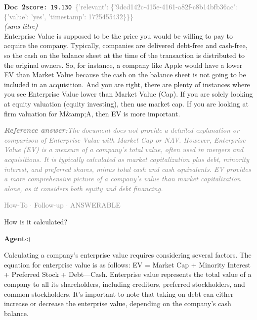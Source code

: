 \documentclass[a4paper,11pt]{article}
\begin{document}
\begin{docenv}
{\footnotesize\textcolor{doccolor}{\textbf{Doc~2}}}\hfill{\tiny\texttt{score:~19.130}}\ {\tiny\textcolor{gray}{\{'relevant': \{'9dcd142c-415e-4161-a82f-c8b14bfb36ac': \{'value': 'yes', 'timestamp': 1725455432\}\}\}}}\\[3pt]
{\small\textit{(sans titre)}}\\[2pt]
\vspace{2pt}
{\footnotesize 
Enterprise Value is supposed to be the price you would be willing to pay to acquire the company. Typically, companies are delivered debt-free and cash-free, so the cash on the balance sheet at the time of the transaction is distributed to the original owners. So, for instance, a company like Apple would have a lower EV than Market Value because the cash on the balance sheet is not going to be included in an acquisition.  And you are right, there are plenty of instances where you see Enterprise Value lower than Market Value (Cap).   If you are solely looking at equity valuation (equity investing), then use market cap. If you are looking at firm valuation for M\&amp;A, then EV is more important.}
\end{docenv}
\begin{refanswerenv}
{\footnotesize\textit{\textcolor{gray}{\textbf{Reference answer:}\enspace The document does not provide a detailed explanation or comparison of Enterprise Value with Market Cap or NAV. However, Enterprise Value (EV) is a measure of a company's total value, often used in mergers and acquisitions. It is typically calculated as market capitalization plus debt, minority interest, and preferred shares, minus total cash and cash equivalents. EV provides a more comprehensive picture of a company's value than market capitalization alone, as it considers both equity and debt financing.}}}
\end{refanswerenv}
\vspace{0.5em}
\hfill{\tiny\textcolor{gray}{How-To $\cdot$ Follow-up $\cdot$ ANSWERABLE}}
\begin{userbubble}
How is it calculated?
\end{userbubble}
\noindent\hfill{\small\textcolor{agentcolor}{\textbf{Agent\enspace$\triangleleft$}}}
\begin{agentbubble}
Calculating a company's enterprise value requires considering several factors. The equation for enterprise value is as follows: EV = Market Cap + Minority Interest + Preferred Stock + Debt—Cash. Enterprise value represents the total value of a company to all its shareholders, including creditors, preferred stockholders, and common stockholders. It's important to note that taking on debt can either increase or decrease the enterprise value, depending on the company's cash balance.
\end{agentbubble}
\end{document}
